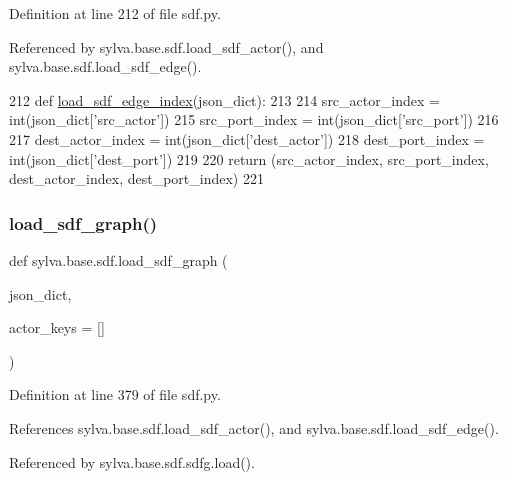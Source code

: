 Definition at line 212 of file sdf.\+py.



Referenced by sylva.\+base.\+sdf.\+load\+\_\+sdf\+\_\+actor(), and sylva.\+base.\+sdf.\+load\+\_\+sdf\+\_\+edge().


\begin{DoxyCode}
212     \textcolor{keyword}{def }\hyperlink{namespacesylva_1_1base_1_1sdf_a67886f481ab9be68797400241d754f64}{load\_sdf\_edge\_index}(json\_dict):
213 
214         src\_actor\_index = int(json\_dict[\textcolor{stringliteral}{'src\_actor'}])
215         src\_port\_index = int(json\_dict[\textcolor{stringliteral}{'src\_port'}])
216 
217         dest\_actor\_index = int(json\_dict[\textcolor{stringliteral}{'dest\_actor'}])
218         dest\_port\_index = int(json\_dict[\textcolor{stringliteral}{'dest\_port'}])
219 
220         \textcolor{keywordflow}{return} (src\_actor\_index, src\_port\_index, dest\_actor\_index, dest\_port\_index)
221 
\end{DoxyCode}
\mbox{\label{namespacesylva_1_1base_1_1sdf_a0bdfa7a81bf9648662631113a609062d}} 
\subsubsection{\texorpdfstring{load\+\_\+sdf\+\_\+graph()}{load\_sdf\_graph()}}
{\footnotesize\ttfamily def sylva.\+base.\+sdf.\+load\+\_\+sdf\+\_\+graph (\begin{DoxyParamCaption}\item[{}]{json\+\_\+dict,  }\item[{}]{actor\+\_\+keys = {\ttfamily \mbox{[}\mbox{]}} }\end{DoxyParamCaption})}



Definition at line 379 of file sdf.\+py.



References sylva.\+base.\+sdf.\+load\+\_\+sdf\+\_\+actor(), and sylva.\+base.\+sdf.\+load\+\_\+sdf\+\_\+edge().



Referenced by sylva.\+base.\+sdf.\+sdfg.\+load().


